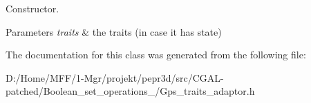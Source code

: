 Constructor. 


\begin{DoxyParams}{Parameters}
{\em traits} & the traits (in case it has state) \\
\hline
\end{DoxyParams}


The documentation for this class was generated from the following file\+:\begin{DoxyCompactItemize}
\item 
D\+:/\+Home/\+M\+F\+F/1-\/\+Mgr/projekt/pepr3d/src/\+C\+G\+A\+L-\/patched/\+Boolean\+\_\+set\+\_\+operations\+\_/Gps\+\_\+traits\+\_\+adaptor.\+h\end{DoxyCompactItemize}
